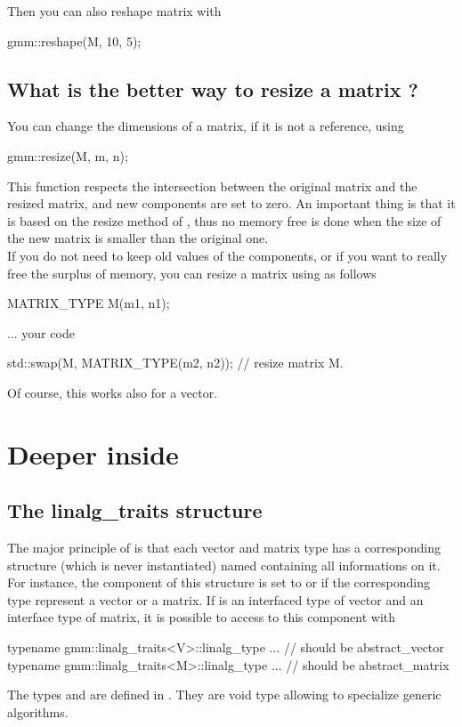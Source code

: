 \documentclass[11pt,a4paper]{article}
\begin{document}
Then you can also reshape matrix  with
\begin{cppcode}
  gmm::reshape(M, 10, 5);
\end{cppcode}

\subsection{What is the better way to resize a matrix ?}
You can change the dimensions of a matrix, if it is not a reference, using
\begin{cppcode}
  gmm::resize(M, m, n);
\end{cppcode}
This function respects the intersection between the original matrix and the resized matrix, and new components are set to zero. An important thing is that it is based on the resize method of , thus no memory free is done when the size of the new matrix is smaller than the original one.\\[0.5cm]

If you do not need to keep old values of the components, or if you want to really free the surplus of memory, you can resize a matrix using  as follows
\begin{cppcode}
  MATRIX_TYPE M(m1, n1);

  ... your code

  std::swap(M, MATRIX_TYPE(m2, n2)); // resize matrix M.
\end{cppcode}
Of course, this works also for a vector.


\section{Deeper inside \gmm}

\subsection{The linalg_traits structure}
The major principle of \gmm is that each vector and matrix type has a corresponding structure (which is never instantiated) named  containing all informations on it. For instance, the component  of this structure is set to  or  if the corresponding type represent a vector or a matrix. If  is an interfaced type of vector and  an interface type of matrix, it is possible to access to this component with
\begin{cppcode}
  typename gmm::linalg_traits<V>::linalg_type ...  // should be abstract_vector
  typename gmm::linalg_traits<M>::linalg_type ...  // should be abstract_matrix
\end{cppcode}
The types  and  are defined in . They are void type allowing to specialize generic algorithms.\\
\end{document}

